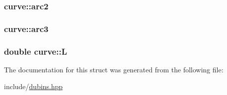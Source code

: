 \subsubsection[{\texorpdfstring{arc2}{arc2}}]{ curve\+::arc2}\hypertarget{structcurve_a083ce33b9edd1a56fe43b876d04f7364}{}\label{structcurve_a083ce33b9edd1a56fe43b876d04f7364}
\subsubsection[{\texorpdfstring{arc3}{arc3}}]{ curve\+::arc3}\hypertarget{structcurve_aba4fe40ec5f59f6486fece0130ee6e0d}{}\label{structcurve_aba4fe40ec5f59f6486fece0130ee6e0d}
\subsubsection[{\texorpdfstring{L}{L}}]{\setlength{\rightskip}{0pt plus 5cm}double curve\+::L}\hypertarget{structcurve_a27eddb6f3444830629650419b4abb840}{}\label{structcurve_a27eddb6f3444830629650419b4abb840}


The documentation for this struct was generated from the following file\+:\begin{DoxyCompactItemize}
\item 
include/\hyperlink{dubins_8hpp}{dubins.\+hpp}\end{DoxyCompactItemize}
